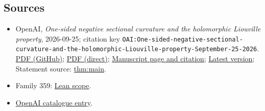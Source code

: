 \documentclass[11pt]{article}
\begin{document}
\subsection{Sources}
\begin{itemize}
\item OpenAI, \emph{One-sided negative sectional curvature and the holomorphic Liouville property}, 2026-09-25; citation key \texttt{OAI:One-sided-negative-sectional-curvature-and-the-holomorphic-Liouville-property-September-25-2026}. \href{https://github.com/openai/math/blob/adc7f1241b42e322a6451854ab7e4b4c146bf78a/preprints/One-sided-negative-sectional-curvature-and-the-holomorphic-Liouville-property-September-25-2026/paper.pdf}{PDF (GitHub)}; \href{https://github.com/openai/math/raw/adc7f1241b42e322a6451854ab7e4b4c146bf78a/preprints/One-sided-negative-sectional-curvature-and-the-holomorphic-Liouville-property-September-25-2026/paper.pdf}{PDF (direct)}; \href{https://github.com/openai/math/blob/adc7f1241b42e322a6451854ab7e4b4c146bf78a/preprints/One-sided-negative-sectional-curvature-and-the-holomorphic-Liouville-property-September-25-2026/README.md}{Manuscript page and citation}; \href{https://github.com/openai/math/blob/main/preprints/One-sided-negative-sectional-curvature-and-the-holomorphic-Liouville-property-September-25-2026/paper.pdf}{Latest version}; Statement source: \href{https://github.com/openai/math/blob/adc7f1241b42e322a6451854ab7e4b4c146bf78a/preprints/One-sided-negative-sectional-curvature-and-the-holomorphic-Liouville-property-September-25-2026/build/01-introduction.tex\#L21}{thm:main}.
\item Family 359: \href{https://github.com/openai/math/blob/adc7f1241b42e322a6451854ab7e4b4c146bf78a/lean/docs/359.md}{Lean scope}.
\item \href{https://github.com/openai/math/blob/adc7f1241b42e322a6451854ab7e4b4c146bf78a/CONTENTS.md}{OpenAI catalogue entry}.
\end{itemize}
\end{document}
